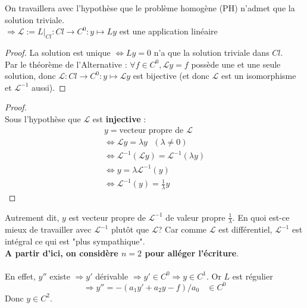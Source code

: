 \documentclass[11pt, a4paper, openany]{book}
\begin{document}
		On travaillera avec l'hypothèse que le problème homogène (PH) n'admet que la solution triviale.\\ $\Rightarrow \mathcal{L} := L|_{Cl} : Cl \rightarrow C^0 : y \mapsto Ly$ est une application linéaire
		\begin{proof}
			La solution est unique $\Leftrightarrow Ly = 0$ n'a que la solution triviale dans $Cl$. \\Par le théorème de l'Alternative : $\forall f \in C^0, \mathcal{L}y = f$ possède une et une seule solution, donc $\mathcal{L} : Cl \rightarrow C^0 : y \mapsto \mathcal{L}y$ est bijective (et donc $\mathcal{L}$ est un isomorphisme et  $\mathcal{L}^{-1}$ aussi).
		\end{proof}
														
		\begin{proof}
			\ \\ Sous l'hypothèse que $\mathcal{L}$ est \textbf{injective} :
			\begin{eqnarray}
				y = \text{vecteur propre de }\mathcal{L}\\
				\Leftrightarrow \mathcal{L}y = \lambda y\ \ \ (\lambda \neq 0)\\
				\Leftrightarrow \mathcal{L}^{-1}(\mathcal{L}y) = \mathcal{L}^{-1}(\lambda y)\\
				\Leftrightarrow y = \lambda \mathcal{L}^{-1}(y)\\
				\Leftrightarrow \mathcal{L}^{-1}(y) = \frac{1}{\lambda}y
			\end{eqnarray}
		\end{proof}
		Autrement dit, $y$ est vecteur propre de $\mathcal{L}^{-1}$ de valeur propre $\frac{1}{\lambda}$. En quoi est-ce mieux de travailler avec $\mathcal{L}^{-1}$ plutôt que $\mathcal{L}$? Car comme $\mathcal{L}$ est différentiel, $\mathcal{L}^{-1}$ est intégral ce qui est "plus sympathique".\\
		\textbf{A partir d'ici, on considère $n=2$ pour alléger l'écriture}.\\
														
		\ \\
		En effet, $y''$ existe $\Rightarrow y'$ dérivable $\Rightarrow y' \in C^0 \Rightarrow y \in C^1$. Or $L$ est régulier 
		\begin{equation}
			\Rightarrow y'' = -(a_1y' + a_2y-f)/a_0\ \ \ \ \in C^0
		\end{equation}
		Donc $y \in C^2$.
														
\end{document}
